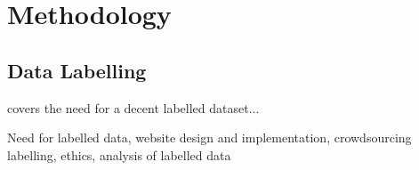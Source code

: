 
\section{Methodology}





\subsection{Data Labelling}
 covers the need for a decent labelled dataset...

Need for labelled data, website design and implementation, crowdsourcing labelling, ethics, analysis of labelled data
